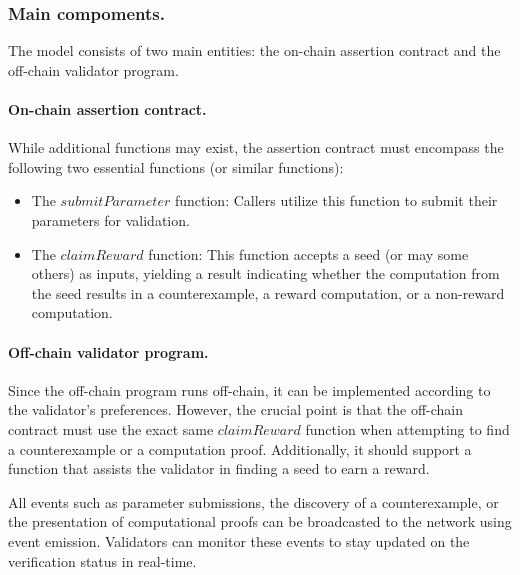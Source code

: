 \documentclass[runningheads]{llncs}
\begin{document}
\subsubsection{Main compoments.} The model consists of two main entities: the on-chain assertion contract and the off-chain validator program.
\paragraph{On-chain assertion contract.}
While additional functions may exist, the assertion contract must encompass the following two essential functions (or similar functions):
\begin{itemize}
\item The \( submitParameter \) function: Callers utilize this function to submit their parameters for validation. %
\item  The \( claimReward \) function: This function accepts a seed (or may some others) as inputs, yielding a result indicating whether the computation from the seed results in a counterexample, a reward computation, or a non-reward computation.
\end{itemize}
\paragraph{Off-chain validator program.}
Since the off-chain program runs off-chain, it can be implemented according to the validator's preferences. However, the crucial point is that the off-chain contract must use the exact same \( claimReward \) function when attempting to find a counterexample or a computation proof. Additionally, it should support a function that assists the validator in finding a seed to earn a reward.

All events such as parameter submissions, the discovery of a counterexample, or the presentation of computational proofs can be broadcasted to the network using event emission. Validators can monitor these events to stay updated on the verification status in real-time.
\end{document}
